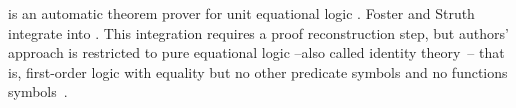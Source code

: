 \documentclass[main.tex]{subfiles}
\begin{document}


 is an automatic theorem prover for unit
equational logic \cite{hillenbrand1997}. Foster and Struth
\cite{foster2011integrating} integrate  into \Agda
\cite{agdateam}. This integration requires a proof reconstruction
step, but authors' approach is restricted to pure equational logic
--also called identity theory~\cite{humberstone2011}-- that is,
first-order logic with equality but no other predicate symbols and
no functions symbols~\cite{appel1959}.

\end{document}
